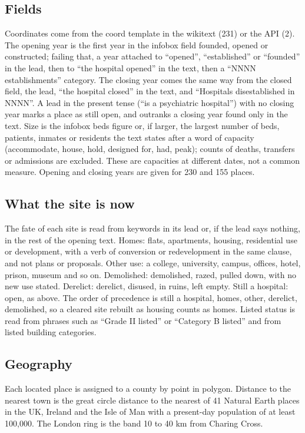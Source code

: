 \documentclass[11pt,a4paper]{article}
\begin{document}
\subsection{Fields}
Coordinates come from the coord template in the wikitext (231) or the API (2). The opening year is the first year in the infobox field founded, opened or constructed; failing that, a year attached to ``opened'', ``established'' or ``founded'' in the lead, then to ``the hospital opened'' in the text, then a ``NNNN establishments'' category. The closing year comes the same way from the closed field, the lead, ``the hospital closed'' in the text, and ``Hospitals disestablished in NNNN''. A lead in the present tense (``is a psychiatric hospital'') with no closing year marks a place as still open, and outranks a closing year found only in the text. Size is the infobox beds figure or, if larger, the largest number of beds, patients, inmates or residents the text states after a word of capacity (accommodate, house, hold, designed for, had, peak); counts of deaths, transfers or admissions are excluded. These are capacities at different dates, not a common measure. Opening and closing years are given for 230 and 155 places.

\subsection{What the site is now}
The fate of each site is read from keywords in its lead or, if the lead says nothing, in the rest of the opening text. Homes: flats, apartments, housing, residential use or development, with a verb of conversion or redevelopment in the same clause, and not plans or proposals. Other use: a college, university, campus, offices, hotel, prison, museum and so on. Demolished: demolished, razed, pulled down, with no new use stated. Derelict: derelict, disused, in ruins, left empty. Still a hospital: open, as above. The order of precedence is still a hospital, homes, other, derelict, demolished, so a cleared site rebuilt as housing counts as homes. Listed status is read from phrases such as ``Grade II listed'' or ``Category B listed'' and from listed building categories.

\subsection{Geography}
Each located place is assigned to a county by point in polygon. Distance to the nearest town is the great circle distance to the nearest of 41 Natural Earth places in the UK, Ireland and the Isle of Man with a present-day population of at least 100,000. The London ring is the band 10 to 40 km from Charing Cross.
\end{document}
